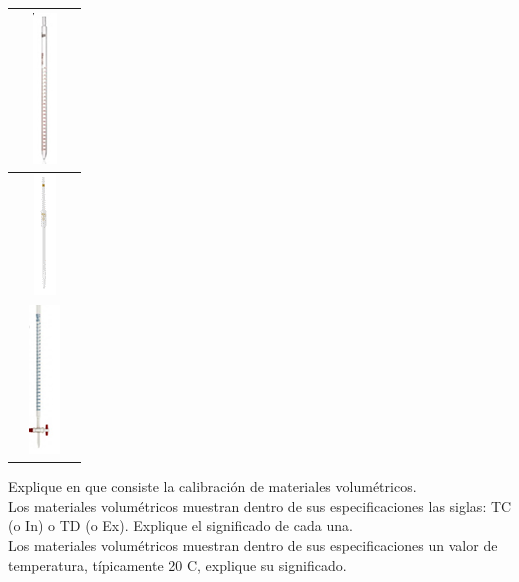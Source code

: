 \begin{table}[ht!]
\begin{tabularx}{\linewidth}{|>{\hsize}C|>{\hsize}C|>{\hsize}L|}
     & \includegraphics[trim=0 0 0 -5, scale=0.8]{images/p5.png} & \\\hline
     & \includegraphics[trim=0 0 0 -5, scale=0.8]{images/p6.png} & \\\hline
     & \includegraphics[trim=0 0 0 -5, scale=0.8]{images/p7.png} & \\\hline
    \end{tabularx}
\end{table}

Explique en que consiste la calibración de materiales volumétricos.\\[10pt]

Los materiales volumétricos muestran dentro de sus especificaciones las siglas: TC (o In) o TD (o Ex). Explique el significado de cada una.\\[10pt]

Los materiales volumétricos muestran dentro de sus especificaciones un valor de temperatura, típicamente 20 C, explique su significado.